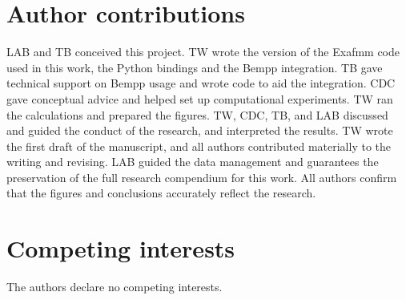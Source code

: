 \documentclass[twocolumn]{article}
\begin{document}
\section*{Author contributions}
LAB and TB conceived this project. 
TW wrote the version of the Exafmm code used in this work, the Python bindings and the Bempp integration. 
TB gave technical support on Bempp usage and wrote code to aid the integration.
CDC gave conceptual advice and helped set up computational experiments.
TW ran the calculations and prepared the figures.
TW, CDC, TB, and LAB discussed and guided the conduct of the research, and interpreted the results.
TW wrote the first draft of the manuscript, and all authors contributed materially to the writing and revising.
LAB guided the data management and guarantees the preservation of the full research compendium for this work. 
All authors confirm that the figures and conclusions accurately reflect the research.


\section*{Competing interests}
The authors declare no competing interests.
\end{document}
